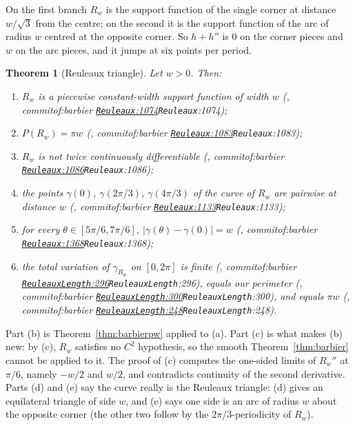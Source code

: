 \documentclass[11pt]{article}
\newtheorem{theorem}{Theorem}
\theoremstyle{definition}
\theoremstyle{remark}
\newcommand{\commitof}[1]{\csname commitof:#1\endcsname}
\newcommand{\repo}[1]{https://github.com/jpbald93/#1}
\newcommand{\src}[4]{\ifcsname commitof:#1\endcsname
  \href{\repo{#1}/blob/\commitof{#1}/#2/#3.lean\#L#4}{\texttt{#3}:#4}\else\texttt{#3}:#4\fi}
\begin{document}
On the first branch $R_w$ is the support function of the single corner at distance $w/\sqrt3$ from
the centre; on the second it is the support function of the arc of radius $w$ centred at the
opposite corner. So $h+h''$ is $0$ on the corner pieces and $w$ on the arc pieces, and it jumps at
six points per period.

\begin{theorem}[Reuleaux triangle]\label{thm:reuleaux}
Let $w>0$. Then:
\begin{enumerate}
\item[(a)] $R_w$ is a piecewise constant-width support function of width $w$
(, \src{barbier}{Barbier}{Reuleaux}{1074});
\item[(b)] $P(R_w) = \pi w$ (, \src{barbier}{Barbier}{Reuleaux}{1083});
\item[(c)] $R_w$ is not twice continuously differentiable (, \src{barbier}{Barbier}{Reuleaux}{1086});
\item[(d)] the points $\gamma(0)$, $\gamma(2\pi/3)$, $\gamma(4\pi/3)$ of the curve of $R_w$ are pairwise
at distance $w$ (, \src{barbier}{Barbier}{Reuleaux}{1133});
\item[(e)] for every $\theta\in[5\pi/6, 7\pi/6]$, $\lvert\gamma(\theta)-\gamma(0)\rvert = w$
(, \src{barbier}{Barbier}{Reuleaux}{1368});
\item[(f)] the total variation of $\gamma_{R_w}$ on $[0,2\pi]$ is finite
(, \src{barbier}{Barbier}{ReuleauxLength}{296}), equals our
perimeter (, \src{barbier}{Barbier}{ReuleauxLength}{300}),
and equals $\pi w$ (, \src{barbier}{Barbier}{ReuleauxLength}{248}).
\end{enumerate}
\end{theorem}

Part (b) is Theorem~\ref{thm:barbierpw} applied to (a). Part (c) is what makes (b) new: by (c), $R_w$
satisfies no $C^2$ hypothesis, so the smooth Theorem~\ref{thm:barbier} cannot be applied to it. The
proof of (c) computes the one-sided limits of $R_w''$ at $\pi/6$, namely $-w/2$ and $w/2$, and
contradicts continuity of the second derivative. Parts (d) and (e) say the curve really is the
Reuleaux triangle: (d) gives an equilateral triangle of side $w$, and (e) says one side is an arc of
radius $w$ about the opposite corner (the other two follow by the $2\pi/3$-periodicity of $R_w$).
\end{document}
